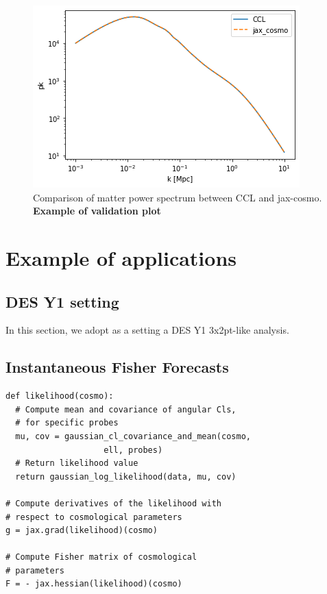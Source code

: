 \documentclass[final,5p,times,twocolumn,authoryear]{elsarticle}
\begin{document}
\begin{figure}[ht]
    \centering
    \includegraphics[width=\columnwidth]{figures/halofit_pk.png}
    \caption{Comparison of matter power spectrum between CCL and jax-cosmo. \textbf{Example of validation plot} \href{https://github.com/DifferentiableUniverseInitiative/jax_cosmo/blob/master/docs/notebooks/CCL_comparison.ipynb}{\faFileCodeO}}
    \label{fig:halofit_comparison}
\end{figure}



\section{Example of applications}

\subsection{DES Y1 setting}
 
In this section, we adopt as a setting a DES Y1 3x2pt-like analysis. 


\subsection{Instantaneous Fisher Forecasts}
\label{sec-fisher-forecast}
\begin{verbatim}
def likelihood(cosmo):
  # Compute mean and covariance of angular Cls, 
  # for specific probes
  mu, cov = gaussian_cl_covariance_and_mean(cosmo, 
                    ell, probes)
  # Return likelihood value
  return gaussian_log_likelihood(data, mu, cov)

# Compute derivatives of the likelihood with 
# respect to cosmological parameters
g = jax.grad(likelihood)(cosmo)

# Compute Fisher matrix of cosmological 
# parameters
F = - jax.hessian(likelihood)(cosmo)
\end{verbatim}
\end{document}
